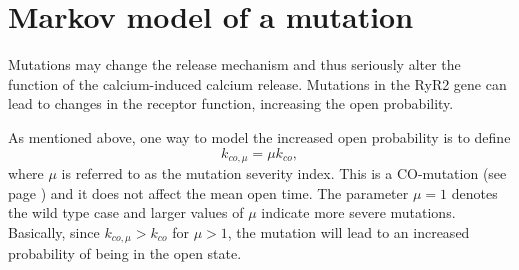 \bigskip

\section{Markov model of a mutation}

Mutations may change the release mechanism and thus seriously alter the
function of the calcium-induced calcium release. Mutations in the RyR2
gene can lead to changes in the receptor function, increasing the open
probability. 

As mentioned above, one way to model the increased open probability
is to define
\begin{equation}
k_{co,\mu}=\mu k_{co}, \label{severity}%
\end{equation}
where $\mu$ is referred to as the mutation severity index. This is a
CO-mutation (see page \pageref{com}) and it does not affect the mean open
time. The parameter $\mu=1$ denotes the wild type case and larger values of
$\mu$ indicate more severe mutations. Basically, since $k_{co,\mu}>k_{co} $
for $\mu>1$, the mutation will lead to an increased probability of being in the
open state.

